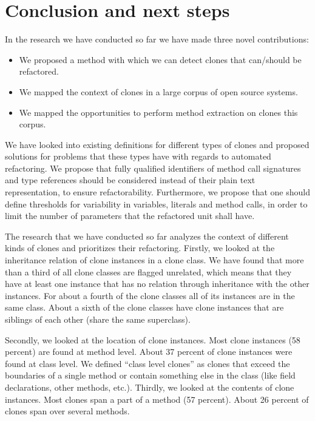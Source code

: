 \documentclass[a4paper]{article}
\begin{document}
\section{Conclusion and next steps}\label{chap:conclusion}
In the research we have conducted so far we have made three novel contributions:
\begin{itemize}
    \item We proposed a method with which we can detect clones that can/should be refactored.
    \item We mapped the context of clones in a large corpus of open source systems.
    \item We mapped the opportunities to perform method extraction on clones this corpus.
\end{itemize}

We have looked into existing definitions for different types of clones \cite{roy2007survey} and proposed solutions for problems that these types have with regards to automated refactoring. We propose that fully qualified identifiers of method call signatures and type references should be considered instead of their plain text representation, to ensure refactorability. Furthermore, we propose that one should define thresholds for variability in variables, literals and method calls, in order to limit the number of parameters that the refactored unit shall have.

The research that we have conducted so far analyzes the context of different kinds of clones and prioritizes their refactoring. Firstly, we looked at the inheritance relation of clone instances in a clone class. We have found that more than a third of all clone classes are flagged unrelated, which means that they have at least one instance that has no relation through inheritance with the other instances. For about a fourth of the clone classes all of its instances are in the same class. About a sixth of the clone classes have clone instances that are siblings of each other (share the same superclass).

Secondly, we looked at the location of clone instances. Most clone instances (58 percent) are found at method level. About 37 percent of clone instances were found at class level. We defined ``class level clones'' as clones that exceed the boundaries of a single method or contain something else in the class (like field declarations, other methods, etc.). Thirdly, we looked at the contents of clone instances. Most clones span a part of a method (57 percent). About 26 percent of clones span over several methods.
\end{document}
